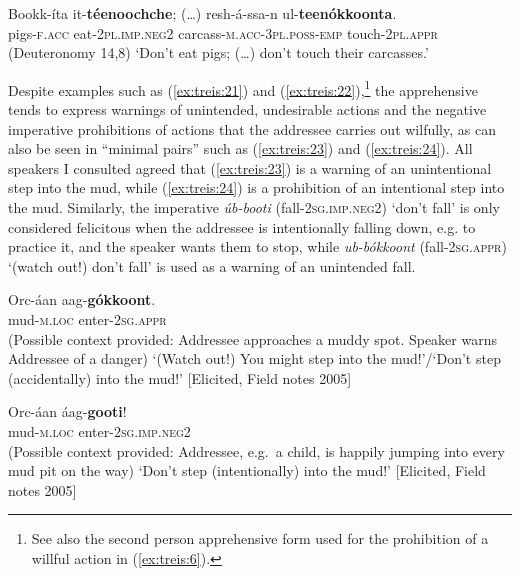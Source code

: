 \documentclass[output=paper,colorlinks,citecolor=brown,]{langscibook}
\begin{document}
\ea\label{ex:treis:22}
\gll Bookk-íta 	it-\textbf{téenoochche}; \textnormal{(\ldots)} 	resh-á-ssa-n 						ul-\textbf{teenókkoonta}. \\
pigs-\textsc{f.acc}	eat-\textsc{2pl.imp.neg2} {} carcass-\textsc{m.acc-3pl.poss-emp}	touch-\textsc{2pl.appr}\\
\glt (Deuteronomy 14,8) `Don't eat pigs; (\ldots) don't touch their carcasses.'   \citep{KHTPHNodate}
\z 

Despite examples such as (\ref{ex:treis:21}) and (\ref{ex:treis:22}),\footnote{See also the second person apprehensive form used for the prohibition of a willful action in (\ref{ex:treis:6}).} the apprehensive tends to express warnings of unintended, undesirable actions and the negative imperative prohibitions of actions that the addressee carries out wilfully, as can also be seen in ``minimal pairs'' such as (\ref{ex:treis:23}) and (\ref{ex:treis:24}). All speakers I consulted agreed that (\ref{ex:treis:23}) is a warning of an unintentional step into the mud, while (\ref{ex:treis:24}) is a prohibition of an intentional step into the mud. Similarly, the imperative \textit{úb-booti} (fall-\textsc{2sg.imp.neg2}) `don't fall' is only considered felicitous when the addressee is intentionally falling down, e.g. to practice it, and the speaker wants them to stop, while \textit{ub-bókkoont} (fall-\textsc{2sg.appr}) `(watch out!) don't fall' is used as a warning of an unintended fall.

\ea\label{ex:treis:23}
\gll Orc-áan aag-\textbf{gókkoont}. \\
mud-\textsc{m.loc} enter-\textsc{2sg.appr}\\
\glt (Possible context provided: Addressee approaches a muddy spot. Speaker warns Addressee of a danger) `(Watch out!) You might step into the mud!'\slash `Don't step (accidentally) into the mud!'  [Elicited, Field notes 2005]
\z 

\ea\label{ex:treis:24} 
\gll Orc-áan áag-\textbf{gooti}!\\
mud-\textsc{m.loc} enter-\textsc{2sg.imp.neg2}\\
\glt (Possible context provided: Addressee,  e.g.\ a child, is happily jumping into every mud pit on the way) `Don't step (intentionally) into the mud!'  [Elicited, Field notes 2005]
\z 
\end{document}
